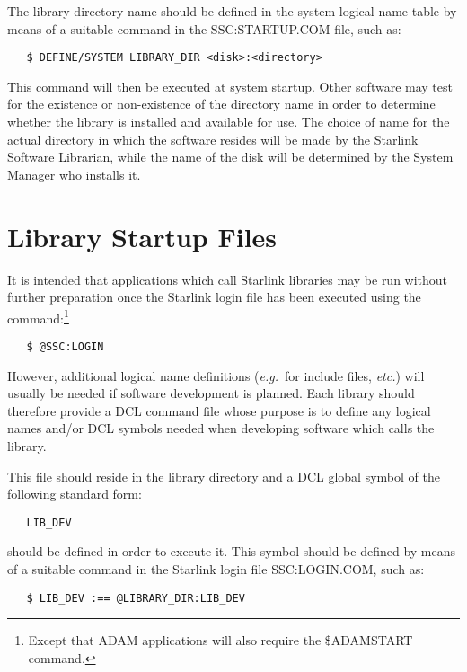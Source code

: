 The library directory name should be defined in the system logical name
table by means of a suitable command in the SSC:STARTUP.COM file, such as:

\begin{verbatim}
   $ DEFINE/SYSTEM LIBRARY_DIR <disk>:<directory>
\end{verbatim}

This command will then be executed at system startup.
Other software may test for the existence or non-existence of the directory
name in order to determine whether the library is installed and available
for use.
The choice of name for the actual directory in which the software resides
will be made by the Starlink Software Librarian, while the name of the disk
will be determined by the System Manager who installs it.


\section{Library Startup Files}
\label{ss:librarystartup}

It is intended that applications which call Starlink libraries may be run
without further preparation once the Starlink login file has been executed
using the command:\footnote{Except that ADAM applications will also require
the \$ADAMSTART command.}

\begin{verbatim}
   $ @SSC:LOGIN
\end{verbatim}

However, additional logical name definitions ({\em e.g.}\ for include files,
{\em etc.}) will usually be needed if software development is planned.
Each library should therefore provide a DCL command file whose purpose is to
define any logical names and/or DCL symbols needed when developing software
which calls the library.

This file should reside in the library directory and a DCL global symbol of
the following standard form:

\begin{verbatim}
   LIB_DEV
\end{verbatim}

should be defined in order to execute it.
This symbol should be defined by means of a suitable command in the Starlink
login file SSC:LOGIN.COM, such as:

\begin{verbatim}
   $ LIB_DEV :== @LIBRARY_DIR:LIB_DEV
\end{verbatim}

